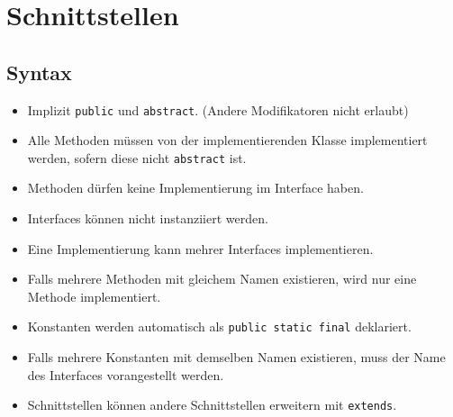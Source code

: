 \section{Schnittstellen}


\subsection{Syntax}
\begin{minipage}[t]{0.51\columnwidth}
    \raggedright%
    \begin{itemize}
        \item Implizit \lstinline{public} und \lstinline{abstract}. (Andere Modifikatoren nicht erlaubt)
        \item Alle Methoden müssen von der implementierenden Klasse implementiert werden, sofern diese nicht \lstinline{abstract} ist.
        \item Methoden dürfen keine Implementierung im Interface haben.
        \item Interfaces können nicht instanziiert werden.
        \item Eine Implementierung kann mehrer Interfaces implementieren.
        \item Falls mehrere Methoden mit gleichem Namen existieren, wird nur eine Methode implementiert.
        \item Konstanten werden automatisch als \lstinline{public static final} deklariert.
    \end{itemize}
\end{minipage}\hfill%
\begin{minipage}[t]{0.48\columnwidth}
    \vspace{-0.8\abovedisplayskip}
    
    
\end{minipage}


\begin{itemize}
    \item Falls mehrere Konstanten mit demselben Namen existieren, muss der Name des Interfaces vorangestellt werden.
    \item Schnittstellen können andere Schnittstellen erweitern mit \lstinline{extends}.
\end{itemize}


